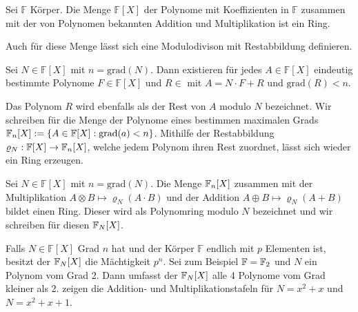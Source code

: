 \begin{satz}
    Sei $\mathbb{F}$ Körper. Die Menge $\mathbb{F} {[X]}$ der Polynome mit Koeffizienten in $\mathbb{F}$ zusammen mit der von Polynomen bekannten Addition und Multiplikation ist ein Ring. 
\end{satz}

Auch für diese Menge lässt sich eine Modulodivison mit Restabbildung definieren. 

\begin{satz}
    Sei $N \in \mathbb{F} {[X]}$ mit $n = \mathrm{grad}(N)$. Dann existieren für jedes $A \in \mathbb{F} {[X]}$ eindeutig bestimmte Polynome $F \in \mathbb{F} {[X]}$ und $R \in $ mit $A = N \cdot F + R$ und $\mathrm{grad}(R) < n$.
\end{satz}


Das Polynom $R$ wird ebenfalls als der Rest von $A$ modulo $N$ bezeichnet. Wir schreiben für die Menge der Polynome eines bestimmen maximalen Grads $\field{n} {[X]} := \{A \in \mathbb{F} {[X]} : \mathrm{grad}(a) < n\}$. Mithilfe der Restabbildung $\varrho_N : \mathbb{F} {[X]} \rightarrow \field{n} {[X]}$, welche jedem Polynom ihren Rest zuordnet, lässt sich wieder ein Ring erzeugen.

\begin{satz}
    Sei $N \in \mathbb{F} {[X]}$ mit $n = \mathrm{grad}(N)$. Die Menge $\field{n} {[X]}$ zusammen mit der Multiplikation $A \otimes B \mapsto \varrho_N(A \cdot B)$ und der Addition $A \oplus B \mapsto \varrho_N(A + B)$ bildet einen Ring. Dieser wird als Polynomring modulo $N$ bezeichnet und wir schreiben für diesen $\field{N} {[X]}$.
\end{satz}

Falls $N \in \mathbb{F} {[X]}$ Grad $n$ hat und der Körper $\mathbb{F}$ endlich mit $p$ Elementen ist, besitzt der $\field{N} {[X]}$ die Mächtigkeit $p^n$.
Sei zum Beispiel $\mathbb{F} = \field{2}$ und $N$ ein Polynom vom Grad 2. Dann umfasst der $\field{N} {[X]}$ alle 4 Polynome vom Grad kleiner als 2.  zeigen die Addition- und Multiplikationstafeln für $N=x^2 + x$ und $N= x^2 + x + 1$.

